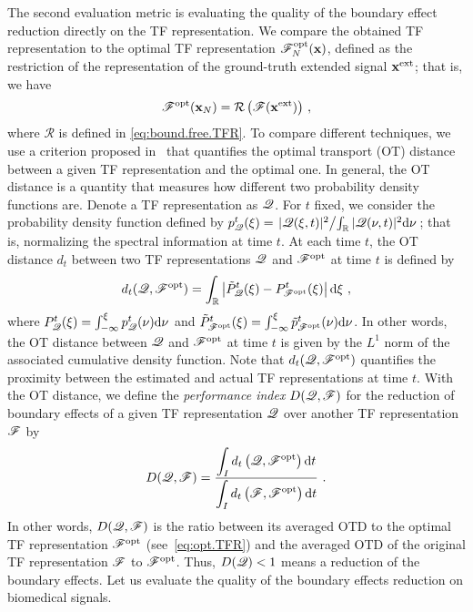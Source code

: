 The second evaluation metric is evaluating the quality of the boundary effect reduction directly on the TF representation. We compare the obtained TF representation to the optimal TF representation ${\mathscr F}_N^\mathrm{opt}({\mathbf x})$, defined as the restriction of the representation of the ground-truth extended signal ${\mathbf x}^\mathrm{ext}$; that is, we have
\begin{equation}
\ccF^\mathrm{opt}(\bx_N) = \cR\left( \ccF(\bx^\mathrm{ext}) \right) \, ,
\label{eq:opt.TFR}
\end{equation} 
where $\mathcal{R}$ is defined in \eqref{eq:bound.free.TFR}.
To compare different techniques, we use a criterion proposed in~\cite{Daubechies16conceft} that quantifies the optimal transport (OT) distance between a given TF representation and the optimal one. In general, the OT distance is a quantity that measures how different two probability density functions are. Denote a TF representation as ${\mathscr Q}$. For $t$ fixed, we consider the probability density function defined by $p_{\mathscr Q}^t(\xi) = \left. |{\mathscr Q}(\xi,t)|^2 \middle/ \int_{\mathbb R} |{\mathscr Q}(\nu,t)|^2\mathrm{d}\nu \right.$; that is, normalizing the spectral information at time $t$. At each time $t$, the OT distance $d_{t}$ between two TF representations ${\mathscr Q}$ and ${\mathscr F}^\mathrm{opt}$ at time $t$ is defined by
\begin{equation*}
d_{t}({\mathscr Q},{\mathscr F}^\mathrm{opt}) = \int_{\mathbb R}\left|\tilde P_{{\mathscr Q}}^t(\xi)-  P_{{\mathscr F}^\mathrm{opt}}^t(\xi)\right|\mathrm{d}\xi\ ,
\end{equation*}
where $P_{{\mathscr Q}}^t(\xi)=\int_{-\infty}^\xi p_{{\mathscr Q}}^t(\nu)\mathrm{d}\nu$ and $\tilde P_{{\mathscr F}^\mathrm{opt}}^t(\xi)=\int_{-\infty}^\xi\tilde p_{{\mathscr F}^\mathrm{opt}}^t(\nu)\mathrm{d}\nu$. In other words, the OT distance between ${\mathscr Q}$ and ${\mathscr F}^\mathrm{opt}$ at time $t$ is given by the $L^1$ norm of the associated cumulative density function.  %
Note that $d_{t}({\mathscr Q},{\mathscr F}^\mathrm{opt})$ quantifies the proximity between the estimated and actual TF representations at time $t$. With the OT distance, we define the {\em performance index} $D({\mathscr Q},{\mathscr F})$ for the reduction of boundary effects of a given TF representation ${\mathscr Q}$ over another TF representation ${\mathscr F}$ by
\begin{equation}
D(\ccQ,\ccF) = \dfrac{\displaystyle\int_I d_{t}\left(\ccQ,\ccF^\mathrm{opt}\right)\dd t}{\displaystyle\int_I d_{t}\left(\ccF,\ccF^\mathrm{opt}\right)\dd t}\ .
\label{eq:index.perf}
\end{equation}
In other words, $D({\mathscr Q},{\mathscr F})$ is the ratio between its averaged OTD to the optimal TF representation ${\mathscr F}^\mathrm{opt}$ (see~\eqref{eq:opt.TFR}) and the averaged OTD of the original TF representation ${\mathscr F}$ to ${\mathscr F}^\mathrm{opt}$.
%
Thus, $D({\mathscr Q})<1$ means a reduction of the boundary effects. Let us evaluate the quality of the boundary effects reduction on biomedical signals.


